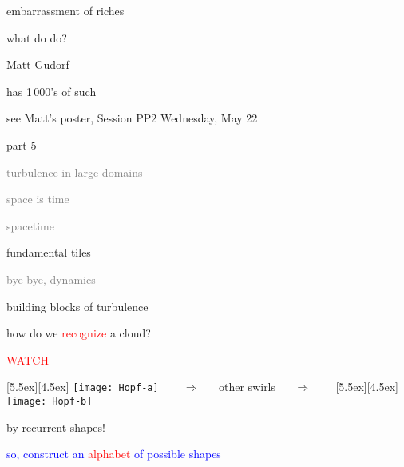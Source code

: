 \begin{frame}{embarrassment of riches}
\begin{center}
{\huge what do do?}
\end{center}

\vfill

{\Large Matt Gudorf}

\medskip

\hfill has 1\,000's of such \twots

\vfill

{\scriptsize see Matt's poster, Session PP2  \hfill Wednesday, May 22}
\end{frame}


\begin{frame}{part 5}
\begin{enumerate}
              \item
    \textcolor{gray}{\small
turbulence in large domains
              \item
space is time
              \item
spacetime
    }
              \item {\Large
fundamental tiles
    }\textcolor{gray}{\small
              \item
bye bye, dynamics
                    }
            \end{enumerate}
\end{frame}


\begin{frame}{building blocks of turbulence}

how do we \textcolor{red}{recognize} a cloud?

\bigskip
\begin{center}
\centerline{\textcolor{red}{\Huge WATCH}}

\begin{minipage}[t]{\textwidth}
	\begin{center}
\centerline{
\raisebox{-4.0ex}[5.5ex][4.5ex]
		 {\texttt{[image: Hopf-a]}}
~~~ $\Longrightarrow$ ~~ {other swirls} ~~ $\Longrightarrow$ ~~~
	\raisebox{-4.0ex}[5.5ex][4.5ex]
		 {\texttt{[image: Hopf-b]}}
          }
	\end{center}
\end{minipage}
\end{center}

\bigskip

{\Large by recurrent shapes!}

\vfill

\centerline{
\textcolor{blue}{so, construct an \textcolor{red}{\Large alphabet} of possible shapes}
}
\end{frame}

